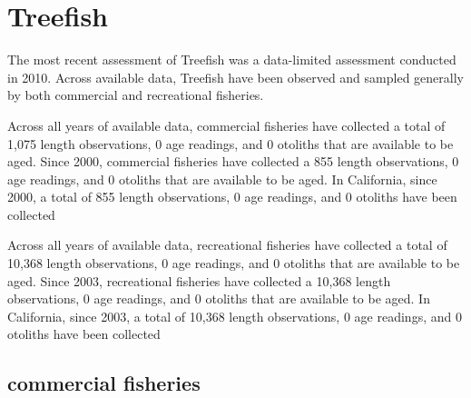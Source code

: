 \documentclass[11pt,
  english,
  letterpaper,
]{article}
\begin{document}

\hypertarget{treefish}{%
\section{Treefish}\label{treefish}}

\leavevmode\tagmcend\tagstructend


The most recent assessment of Treefish was a data-limited assessment conducted in 2010. Across available data, Treefish have been observed and sampled generally by both commercial and recreational fisheries.

\leavevmode\tagmcend\tagstructend\par


Across all years of available data, commercial fisheries have collected a total of 1,075 length observations, 0 age readings, and 0 otoliths that are available to be aged. Since 2000, commercial fisheries have collected a 855 length observations, 0 age readings, and 0 otoliths that are available to be aged. In California, since 2000, a total of 855 length observations, 0 age readings, and 0 otoliths have been collected

\leavevmode\tagmcend\tagstructend\par


Across all years of available data, recreational fisheries have collected a total of 10,368 length observations, 0 age readings, and 0 otoliths that are available to be aged. Since 2003, recreational fisheries have collected a 10,368 length observations, 0 age readings, and 0 otoliths that are available to be aged. In California, since 2003, a total of 10,368 length observations, 0 age readings, and 0 otoliths have been collected

\leavevmode\tagmcend\tagstructend\par


\hypertarget{commercial-fisheries-55}{%
\subsection{commercial fisheries}\label{commercial-fisheries-55}}
\end{document}
